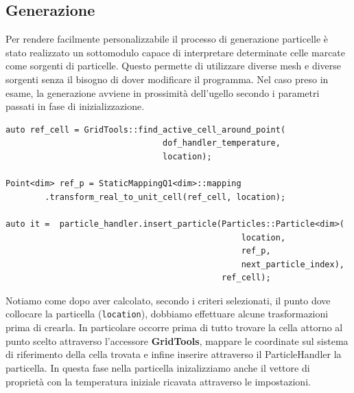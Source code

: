         \subsection{Generazione}
        Per rendere facilmente personalizzabile il processo di generazione particelle è stato realizzato un sottomodulo capace di interpretare determinate celle marcate
        come sorgenti di particelle. Questo permette di utilizzare diverse mesh e diverse sorgenti senza il bisogno di dover modificare il programma. Nel caso preso
        in esame, la generazione avviene in prossimità dell'ugello secondo i parametri passati in fase di inizializzazione.
        \begin{verbatim}
auto ref_cell = GridTools::find_active_cell_around_point(
                                dof_handler_temperature,
                                location);

Point<dim> ref_p = StaticMappingQ1<dim>::mapping
        .transform_real_to_unit_cell(ref_cell, location);

auto it =  particle_handler.insert_particle(Particles::Particle<dim>(
                                                location,
                                                ref_p,
                                                next_particle_index),
                                            ref_cell);
        \end{verbatim}
        Notiamo come dopo aver calcolato, secondo i criteri selezionati, il punto dove collocare la particella (\texttt{location}),
        dobbiamo effettuare alcune trasformazioni prima di crearla. In particolare occorre prima di tutto trovare la cella attorno al punto scelto attraverso l'accessore \textbf{GridTools},
        mappare le coordinate sul sistema di riferimento della cella trovata e infine inserire attraverso il ParticleHandler la particella. In questa fase nella particella inizalizziamo anche
        il vettore di proprietà con la temperatura iniziale ricavata attraverso le impostazioni.
